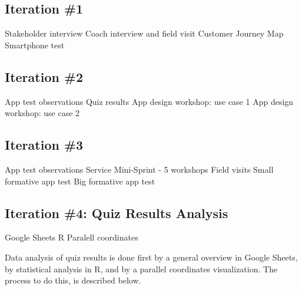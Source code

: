 \subsection{Iteration \#1}

Stakeholder interview
Coach interview and field visit
Customer Journey Map
Smartphone test

\subsection{Iteration \#2}

App test observations
Quiz results
App design workshop: use case 1
App design workshop: use case 2

\subsection{Iteration \#3}
App test observations
Service Mini-Sprint - 5 workshops
Field visits
Small formative app test
Big formative app test

\subsection{Iteration \#4: Quiz Results Analysis}

Google Sheets
R
Paralell coordinates

Data analysis of quiz results is done first by a general overview in Google Sheets, by statistical analysis in R, and by a parallel coordinates visualization. The process to do this, is described below.


